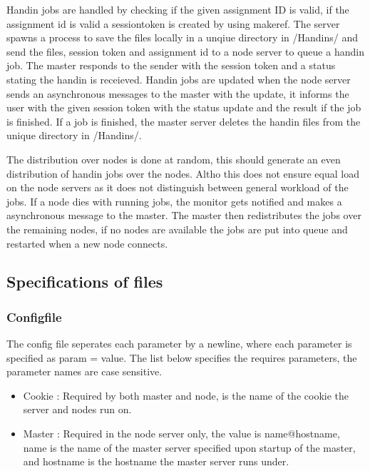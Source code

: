 Handin jobs are handled by checking if the given assignment ID is valid, if the assignment id is valid a sessiontoken is created by using makeref. The server spawns a process to save the files locally in a unqiue directory in /Handins/ and send the files, session token and assignment id to a node server to queue a handin job. The master responds to the sender with the session token and a status stating the handin is receieved. Handin jobs are updated when the node server sends an asynchronous messages to the master with the update, it informs the user with the given session token with the status update and the result if the job is finished. If a job is finished, the master server deletes the handin files from the unique directory in /Handins/.

The distribution over nodes is done at random, this should generate an even distribution of handin jobs over the nodes. Altho this does not ensure equal load on the node servers as it does not distinguish between general workload of the jobs. If a node dies with running jobs, the monitor gets notified and makes a asynchronous message to the master. The master then redistributes the jobs over the remaining nodes, if no nodes are available the jobs are put into queue and restarted when a new node connects.

\subsection{Specifications of files}
\subsubsection{Configfile}
\label{sec:config}
The config file seperates each parameter by a newline, where each parameter is specified as param = value.
The list below specifies the requires parameters, the parameter names are case sensitive.
\begin{itemize}
    \item Cookie : Required by both master and node, is the name of the cookie the server and nodes run on.
    \item Master : Required in the node server only, the value is name@hostname, name is the name of the master server specified upon startup of the master, and hostname is the hostname the master server runs under.
\end{itemize}
